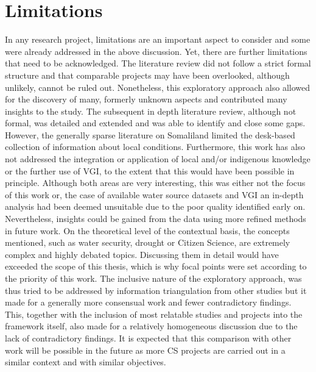 


\section{Limitations}
In any research project, limitations are an important aspect to consider and some were already addressed in the above discussion. Yet, there are further limitations that need to be acknowledged. The literature review did not follow a strict formal structure and that comparable projects may have been overlooked, although unlikely, cannot be ruled out. Nonetheless, this exploratory approach also allowed for the discovery of many, formerly unknown aspects and contributed many insights to the study. The subsequent in depth literature review, although not formal, was detailed and extended and was able to identify and close some gaps. However, the generally sparse literature on Somaliland limited the desk-based collection of information about local conditions. Furthermore, this work has also not addressed the integration or application of local and/or indigenous knowledge or the further use of VGI, to the extent that this would have been possible in principle. Although both areas are very interesting, this was either not the focus of this work or, the case of available water source datasets and VGI an in-depth analysis had been deemed unsuitable due to the poor quality identified early on. Nevertheless, insights could be gained from the data using more refined methods in future work. On the theoretical level of the contextual basis, the concepts mentioned, such as water security, drought or Citizen Science, are extremely complex and highly debated topics. Discussing them in detail would have exceeded the scope of this thesis, which is why focal points were set according to the priority of this work.\newline
The inclusive nature of the exploratory approach, was thus tried to be addressed by information triangulation from other studies but it made for a generally more consensual work and fewer contradictory findings. This, together with the inclusion of most relatable studies and projects into the framework itself, also made for a relatively homogeneous discussion due to the lack of contradictory findings. It is expected that this comparison with other work will be possible in the future as more CS projects are carried out in a similar context and with similar objectives.\newline
